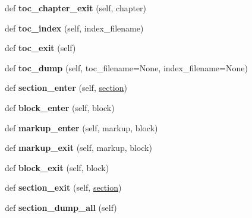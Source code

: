\begin{DoxyCompactItemize}
\item 
\mbox{\label{classtohtml_1_1_html_formatter_ae63863f8155b42c950420b48510a13b8}} 
def {\bfseries toc\+\_\+chapter\+\_\+exit} (self, chapter)
\item 
\mbox{\label{classtohtml_1_1_html_formatter_aec4834ede6ca4be8c6ac91fe94becaf7}} 
def {\bfseries toc\+\_\+index} (self, index\+\_\+filename)
\item 
\mbox{\label{classtohtml_1_1_html_formatter_a8d73753877a0eae8328e4e290de06eff}} 
def {\bfseries toc\+\_\+exit} (self)
\item 
\mbox{\label{classtohtml_1_1_html_formatter_a25840a4b96474135c542c485467dcccc}} 
def {\bfseries toc\+\_\+dump} (self, toc\+\_\+filename=None, index\+\_\+filename=None)
\item 
\mbox{\label{classtohtml_1_1_html_formatter_a5fcc3c66933136861eb36d0ab8bc045e}} 
def {\bfseries section\+\_\+enter} (self, \hyperlink{structsection}{section})
\item 
\mbox{\label{classtohtml_1_1_html_formatter_a668a68920a4987877454fa8fe2d10fa1}} 
def {\bfseries block\+\_\+enter} (self, block)
\item 
\mbox{\label{classtohtml_1_1_html_formatter_a0e18cfa08add6256ff48f0e85566a4af}} 
def {\bfseries markup\+\_\+enter} (self, markup, block)
\item 
\mbox{\label{classtohtml_1_1_html_formatter_a28ff6f4bbd9113ff2a69876046b3200c}} 
def {\bfseries markup\+\_\+exit} (self, markup, block)
\item 
\mbox{\label{classtohtml_1_1_html_formatter_a4888bc91c0bf4d6bf57f9b13e108189b}} 
def {\bfseries block\+\_\+exit} (self, block)
\item 
\mbox{\label{classtohtml_1_1_html_formatter_a54d95a98c85c5187532b9f9a99b8c435}} 
def {\bfseries section\+\_\+exit} (self, \hyperlink{structsection}{section})
\item 
\mbox{\label{classtohtml_1_1_html_formatter_abf08a1aed2dce168137b82161d93bc8f}} 
def {\bfseries section\+\_\+dump\+\_\+all} (self)
\end{DoxyCompactItemize}

